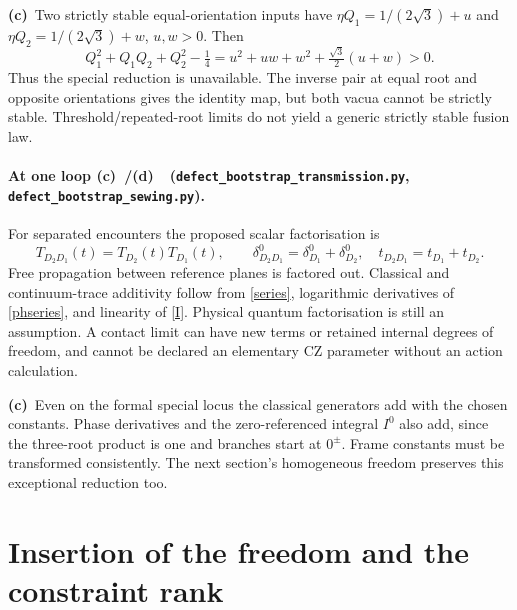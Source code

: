 \documentclass[11pt,a4paper]{article}
\newcommand{\C}{\textbf{(c)}\ }
\newcommand{\D}{\textbf{(d)}\ }
\newcommand{\file}[1]{\nolinkurl{#1}}
\newcommand{\tra}{\file{defect_bootstrap_transmission.py}}
\newcommand{\sew}{\file{defect_bootstrap_sewing.py}}
\begin{document}
\C Two strictly stable equal-orientation inputs have
$\eta Q_1=1/(2\sqrt3)+u$ and $\eta Q_2=1/(2\sqrt3)+w$, $u,w>0$. Then
\begin{equation}
 Q_1^2+Q_1Q_2+Q_2^2-\tfrac14
 =u^2+uw+w^2+\tfrac{\sqrt3}{2}(u+w)>0.\label{nostablefusion}
\end{equation}
Thus the special reduction is unavailable. The inverse pair at equal root
and opposite orientations gives the identity map, but both vacua cannot be
strictly stable. Threshold/repeated-root limits do not yield a generic
strictly stable fusion law.

\paragraph{At one loop \C/\D\ (\tra, \sew).}
For separated encounters the proposed scalar factorisation is
\begin{equation}
 T_{D_2D_1}(t)=T_{D_2}(t)T_{D_1}(t),\qquad
 \delta_{D_2D_1}^0=\delta_{D_1}^0+\delta_{D_2}^0,\quad
 t_{D_2D_1}=t_{D_1}+t_{D_2}.\label{quantseries}
\end{equation}
Free propagation between reference planes is factored out. Classical and
continuum-trace additivity follow from \eqref{series}, logarithmic derivatives
of \eqref{phseries}, and linearity of \eqref{I}. Physical quantum factorisation
is still an assumption. A contact limit can have new terms or retained internal
degrees of freedom, and cannot be declared an elementary CZ parameter without
an action calculation.

\C Even on the formal special locus the classical generators add with the
chosen constants. Phase derivatives and the zero-referenced integral $I^0$
also add, since the three-root product is one and branches start at $0^\pm$.
Frame constants must be transformed consistently. The next section's homogeneous
freedom preserves this exceptional reduction too.

\section{Insertion of the freedom and the constraint rank}
\end{document}
